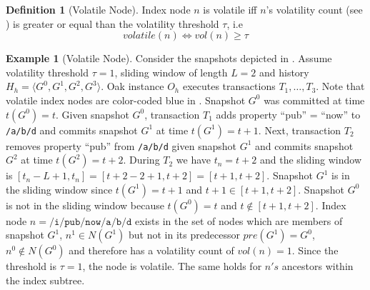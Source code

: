 \documentclass[abstracton,12pt]{scrartcl}
\theoremstyle{definition}
\newtheorem{definition}{Definition}
\newtheorem{example}{Example}
\begin{document}
\vspace{-4mm}

\begin{definition}[Volatile Node]
  Index node $n$ is volatile iff $n$'s volatility count (see
  ) is greater or equal than the volatility threshold
  $\tau$, i.e
  $$ volatile(n) \iff vol(n) \geq \tau $$
  \label{def:volatile_node}
\end{definition}

\vspace{-4mm}

\begin{example}[Volatile Node]
  Consider the snapshots depicted in . Assume volatility
  threshold $\tau = 1$, sliding window of length $L = 2$ and history $H_h
  = \langle G^0,G^1,G^2,G^3 \rangle$. Oak instance $O_h$ executes transactions
  $T_1, \dots , T_3$. Note that volatile index nodes are color-coded
  blue in . Snapshot $G^0$ was committed at time
  $t(G^0) = t$. Given snapshot $G^0$,
  transaction $T_1$ adds property ``pub'' = ``now'' to
  \texttt{/a/b/d} and commits snapshot $G^1$ at time $t(G^1) = t + 1$. Next,
  transaction $T_2$ removes property ``pub'' from \texttt{/a/b/d} given snapshot
  $G^1$ and commits snapshot $G^2$ at time $t(G^2) = t + 2$. During $T_2$ we
  have $t_n=t+2$ and the sliding window is $[t_n-L+1,t_n] = [t+2-2+1,t+2] =
  [t+1,t+2]$. Snapshot $G^1$ is in the sliding window since $t(G^1)=t+1$ and
  $t+1 \in [t+1,t+2]$.
  Snapshot $G^0$ is not in the sliding window because $t(G^0) = t$ and $t \notin
  [t+1,t+2]$. Index node $n = \texttt{/i/pub/now/a/b/d}$ exists in the set of
  nodes which are members of snapshot $G^1$, $n^1 \in N(G^1)$ but not in its
  predecessor $pre(G^1) = G^0$, $n^0 \notin N(G^0)$ and therefore has a volatility
  count of $vol(n) = 1$. Since the threshold is $\tau = 1$, the node is
  volatile. The same holds for $n's$ ancestors within the index subtree.

  \label{ex:volatile_node}
\end{example}

\vspace{-1mm}
\end{document}
